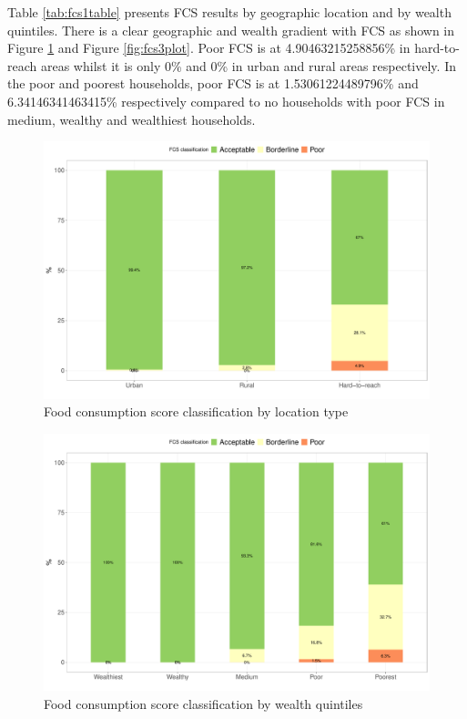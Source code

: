 \documentclass[12pt,a4paper]{article}
\begin{document}
Table \ref{tab:fcs1table} presents FCS results by geographic location and by wealth quintiles. There is a clear geographic and wealth gradient with FCS as shown in Figure \ref{fig:fcs1plot} and Figure \ref{fig:fcs3plot}. Poor FCS is at 4.90463215258856\% in hard-to-reach areas whilst it is only 0\% and 0\% in urban and rural areas respectively. In the poor and poorest households, poor FCS is at 1.53061224489796\% and 6.34146341463415\% respectively compared to no households with poor FCS in medium, wealthy and wealthiest households.

\newpage

\begin{figure}[H]

{\centering \includegraphics{kayahReport_files/figure-latex/fcs1plot-1} 

}

\caption{Food consumption score classification by location type}\label{fig:fcs1plot}
\end{figure}

\begin{figure}[H]

{\centering \includegraphics{kayahReport_files/figure-latex/fcs2plot-1} 

}

\caption{Food consumption score classification by wealth quintiles}\label{fig:fcs2plot}
\end{figure}
\end{document}

